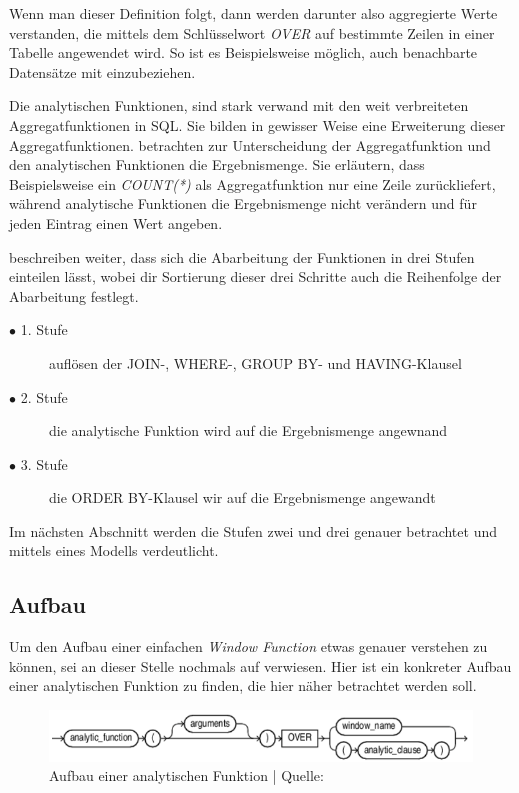 Wenn man dieser Definition folgt, dann werden darunter also aggregierte Werte
verstanden, die mittels dem Schlüsselwort \textit{OVER} auf bestimmte Zeilen in
einer Tabelle angewendet wird. So ist es Beispielsweise möglich, auch
benachbarte Datensätze mit einzubeziehen.

Die analytischen Funktionen, sind stark verwand mit den weit verbreiteten
Aggregatfunktionen in SQL. Sie bilden in gewisser Weise eine Erweiterung dieser Aggregatfunktionen.
\cite{Nuijten2023} betrachten zur Unterscheidung der Aggregatfunktion und den
analytischen Funktionen die Ergebnismenge. Sie erläutern, dass Beispielsweise
ein \textit{COUNT(*)} als Aggregatfunktion nur eine Zeile zurückliefert, während
analytische Funktionen die Ergebnismenge nicht verändern und für jeden Eintrag
einen Wert angeben.

\cite{Nuijten2023} beschreiben weiter, dass sich die Abarbeitung der Funktionen in
drei Stufen einteilen lässt, wobei dir Sortierung dieser drei Schritte auch die
Reihenfolge der Abarbeitung festlegt.

\begin{description}
	\item[$\bullet$ 1. Stufe] auflösen der JOIN-, WHERE-, GROUP BY- und HAVING-Klausel

	\item[$\bullet$ 2. Stufe] die analytische Funktion wird auf die Ergebnismenge angewnand

	\item[$\bullet$ 3. Stufe] die ORDER BY-Klausel wir auf die Ergebnismenge angewandt
\end{description}

Im nächsten Abschnitt werden die Stufen zwei und drei genauer betrachtet und mittels
eines Modells verdeutlicht.

\subsection{Aufbau}
Um den Aufbau einer einfachen \textit{Window Function} etwas genauer verstehen
zu können, sei an dieser Stelle nochmals auf \cite{oracel} verwiesen.
Hier ist ein konkreter Aufbau einer analytischen Funktion zu finden, die hier näher
betrachtet werden soll.

\begin{figure}[h]
	\centering
	\includegraphics[scale=0.5]{img/aufbauAnalyticFunction.jpg}
	\caption{ Aufbau einer analytischen Funktion | Quelle: \cite{oracle}}
\end{figure}

